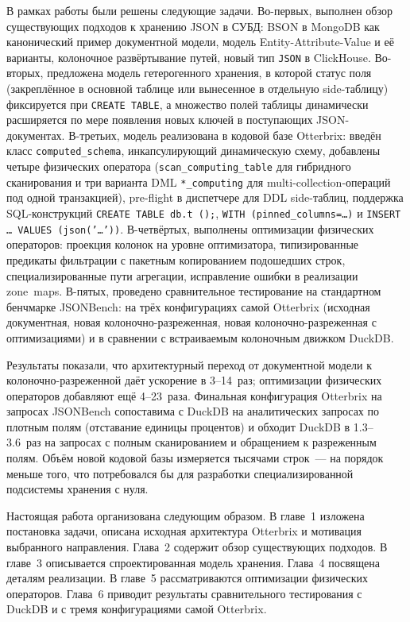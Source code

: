 В рамках работы были решены следующие задачи. Во-первых, выполнен
обзор существующих подходов к хранению JSON в СУБД: BSON в
MongoDB как канонический пример документной модели, модель
Entity-Attribute-Value и её варианты, колоночное развёртывание
путей, новый тип \texttt{JSON} в ClickHouse. Во-вторых, предложена
модель гетерогенного хранения, в которой статус поля (закреплённое
в основной таблице или вынесенное в отдельную side-таблицу)
фиксируется при \texttt{CREATE TABLE}, а множество полей таблицы
динамически расширяется по мере появления новых ключей в
поступающих JSON-документах. В-третьих, модель реализована в
кодовой базе Otterbrix: введён класс \texttt{computed\_schema},
инкапсулирующий динамическую схему, добавлены четыре физических
оператора (\texttt{scan\_computing\_table} для гибридного
сканирования и три варианта DML \texttt{*\_computing} для
multi-collection-операций под одной транзакцией), pre-flight в
диспетчере для DDL side-таблиц, поддержка SQL-конструкций
\texttt{CREATE TABLE db.t ();},
\texttt{WITH (pinned\_columns=\ldots)} и
\texttt{INSERT \ldots\ VALUES (json('\ldots'))}. В-четвёртых,
выполнены оптимизации физических операторов: проекция колонок на
уровне оптимизатора, типизированные предикаты фильтрации с
пакетным копированием подошедших строк, специализированные пути
агрегации, исправление ошибки в реализации zone~maps. В-пятых,
проведено сравнительное тестирование на стандартном бенчмарке
JSONBench: на трёх конфигурациях самой Otterbrix (исходная
документная, новая колоночно-разреженная, новая
колоночно-разреженная с оптимизациями) и в сравнении с
встраиваемым колоночным движком DuckDB.

Результаты показали, что архитектурный переход от документной
модели к колоночно-разреженной даёт ускорение в 3--14~раз;
оптимизации физических операторов добавляют ещё 4--23~раза.
Финальная конфигурация Otterbrix на запросах JSONBench
сопоставима с DuckDB на аналитических запросах по плотным полям
(отставание единицы процентов) и обходит DuckDB в 1.3--3.6~раз на
запросах с полным сканированием и обращением к разреженным полям.
Объём новой кодовой базы измеряется тысячами строк~--- на порядок
меньше того, что потребовался бы для разработки специализированной
подсистемы хранения с нуля.

Настоящая работа организована следующим образом. В главе~1
изложена постановка задачи, описана исходная архитектура Otterbrix
и мотивация выбранного направления. Глава~2 содержит обзор
существующих подходов. В главе~3 описывается спроектированная
модель хранения. Глава~4 посвящена деталям реализации. В главе~5
рассматриваются оптимизации физических операторов. Глава~6
приводит результаты сравнительного тестирования с DuckDB и с
тремя конфигурациями самой Otterbrix.

